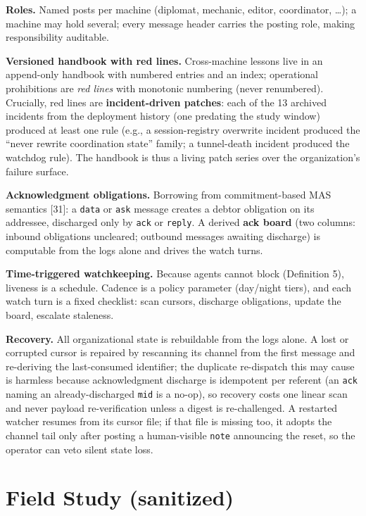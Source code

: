 \documentclass[journal]{IEEEtran}
\begin{document}
\textbf{Roles.} Named posts per machine (diplomat, mechanic, editor,
coordinator, \ldots{}); a machine may hold several; every message header
carries the posting role, making responsibility auditable.

\textbf{Versioned handbook with red lines.} Cross-machine lessons live
in an append-only handbook with numbered entries and an index;
operational prohibitions are \emph{red lines} with monotonic numbering
(never renumbered). Crucially, red lines are \textbf{incident-driven
patches}: each of the 13 archived incidents from the deployment history
(one predating the study window) produced at least one rule (e.g., a
session-registry overwrite incident produced the ``never rewrite
coordination state'' family; a tunnel-death incident produced the
watchdog rule). The handbook is thus a living patch series over the
organization's failure surface.

\textbf{Acknowledgment obligations.} Borrowing from commitment-based MAS
semantics {[}31{]}: a \texttt{data} or \texttt{ask} message creates a
debtor obligation on its addressee, discharged only by \texttt{ack} or
\texttt{reply}. A derived \textbf{ack board} (two columns: inbound
obligations uncleared; outbound messages awaiting discharge) is
computable from the logs alone and drives the watch turns.

\textbf{Time-triggered watchkeeping.} Because agents cannot block
(Definition 5), liveness is a schedule. Cadence is a policy parameter
(day/night tiers), and each watch turn is a fixed checklist: scan
cursors, discharge obligations, update the board, escalate staleness.

\textbf{Recovery.} All organizational state is rebuildable from the logs
alone. A lost or corrupted cursor is repaired by rescanning its channel
from the first message and re-deriving the last-consumed identifier; the
duplicate re-dispatch this may cause is harmless because acknowledgment
discharge is idempotent per referent (an \texttt{ack} naming an
already-discharged \texttt{mid} is a no-op), so recovery costs one
linear scan and never payload re-verification unless a digest is
re-challenged. A restarted watcher resumes from its cursor file; if that
file is missing too, it adopts the channel tail only after posting a
human-visible \texttt{note} announcing the reset, so the operator can
veto silent state loss.



\section{Field Study (sanitized)}
\end{document}
